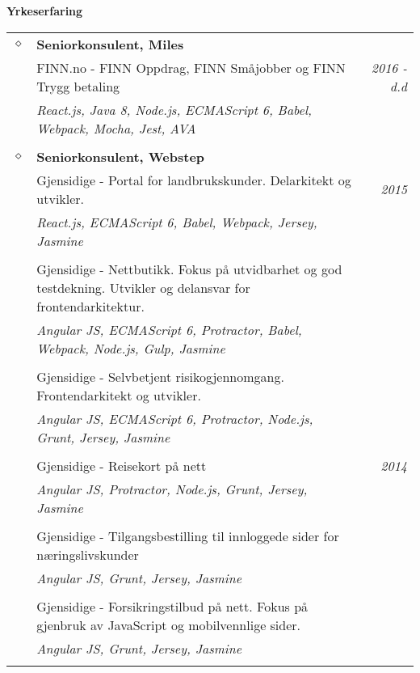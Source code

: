 \documentclass[overlapped,line,letterpaper]{res}
\begin{document}
\begin{resume}
\section{}
\textbf{Yrkeserfaring}\\
\makebox[\textwidth]{\hrulefill}

\begin{tabularx}{\textwidth}{lXr}

$\diamond$	& \textbf{Seniorkonsulent, Miles} 	& \\
& FINN.no - FINN Oppdrag, FINN Småjobber og FINN Trygg betaling & \textit{2016 - d.d} \\
& \small \textit{React.js, Java 8, Node.js, ECMAScript 6, Babel, Webpack, Mocha, Jest, AVA} & \\
&& \\
$\diamond$	& \textbf{Seniorkonsulent, Webstep} 	& \\
& Gjensidige - Portal for landbrukskunder. Delarkitekt og utvikler. & \textit{2015} \\
& \small \textit{React.js, ECMAScript 6, Babel, Webpack, Jersey, Jasmine} & \\
&& \\
& Gjensidige - Nettbutikk. Fokus på utvidbarhet og god testdekning. Utvikler og
delansvar for frontendarkitektur. & \\
& \small \textit{Angular JS, ECMAScript 6, Protractor, Babel, Webpack, Node.js, Gulp, Jasmine} & \\
&& \\
& Gjensidige - Selvbetjent risikogjennomgang. Frontendarkitekt og utvikler. & \\
& \small \textit{Angular JS, ECMAScript 6, Protractor, Node.js, Grunt, Jersey, Jasmine} & \\
&& \\
& Gjensidige - Reisekort på nett & \textit{2014} \\
& \small \textit{Angular JS, Protractor, Node.js, Grunt, Jersey, Jasmine} & \\
&& \\
& Gjensidige - Tilgangsbestilling til innloggede sider for næringslivskunder & \\
& \small \textit{Angular JS, Grunt, Jersey, Jasmine} & \\
&& \\
& Gjensidige - Forsikringstilbud på nett. Fokus på gjenbruk av
JavaScript og mobilvennlige sider. & \\
& \small \textit{Angular JS, Grunt, Jersey, Jasmine} & \\
&& \\
\end{tabularx}


\end{resume}
\end{document}
